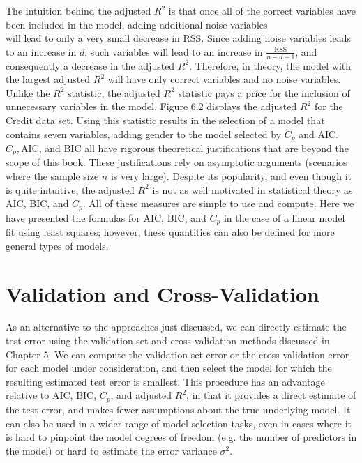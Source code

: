 \documentclass[10pt]{article}
\begin{document}
The intuition behind the adjusted $R^{2}$ is that once all of the correct variables have been included in the model, adding additional noise variables\\
will lead to only a very small decrease in RSS. Since adding noise variables leads to an increase in $d$, such variables will lead to an increase in $\frac{\text { RSS }}{n-d-1}$, and consequently a decrease in the adjusted $R^{2}$. Therefore, in theory, the model with the largest adjusted $R^{2}$ will have only correct variables and no noise variables. Unlike the $R^{2}$ statistic, the adjusted $R^{2}$ statistic pays a price for the inclusion of unnecessary variables in the model. Figure 6.2 displays the adjusted $R^{2}$ for the Credit data set. Using this statistic results in the selection of a model that contains seven variables, adding gender to the model selected by $C_{p}$ and AIC.\\
$C_{p}, \mathrm{AIC}$, and BIC all have rigorous theoretical justifications that are beyond the scope of this book. These justifications rely on asymptotic arguments (scenarios where the sample size $n$ is very large). Despite its popularity, and even though it is quite intuitive, the adjusted $R^{2}$ is not as well motivated in statistical theory as AIC, BIC, and $C_{p}$. All of these measures are simple to use and compute. Here we have presented the formulas for AIC, BIC, and $C_{p}$ in the case of a linear model fit using least squares; however, these quantities can also be defined for more general types of models.

\section*{Validation and Cross-Validation}
As an alternative to the approaches just discussed, we can directly estimate the test error using the validation set and cross-validation methods discussed in Chapter 5. We can compute the validation set error or the cross-validation error for each model under consideration, and then select the model for which the resulting estimated test error is smallest. This procedure has an advantage relative to AIC, BIC, $C_{p}$, and adjusted $R^{2}$, in that it provides a direct estimate of the test error, and makes fewer assumptions about the true underlying model. It can also be used in a wider range of model selection tasks, even in cases where it is hard to pinpoint the model degrees of freedom (e.g. the number of predictors in the model) or hard to estimate the error variance $\sigma^{2}$.
\end{document}
